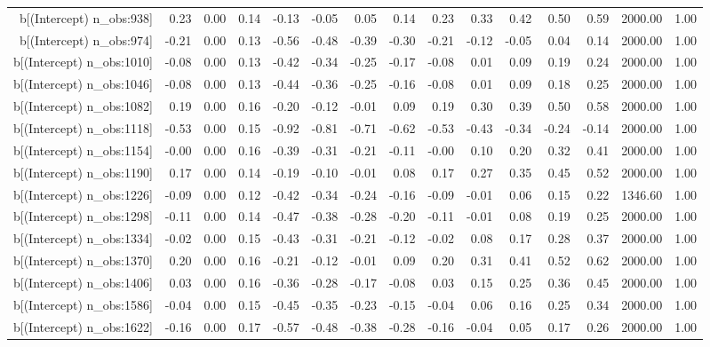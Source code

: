 \begin{table}[ht]
\begin{tabular}{rrrrrrrrrrrrrrr}
  b[(Intercept) n\_obs:938] & 0.23 & 0.00 & 0.14 & -0.13 & -0.05 & 0.05 & 0.14 & 0.23 & 0.33 & 0.42 & 0.50 & 0.59 & 2000.00 & 1.00 \\ 
  b[(Intercept) n\_obs:974] & -0.21 & 0.00 & 0.13 & -0.56 & -0.48 & -0.39 & -0.30 & -0.21 & -0.12 & -0.05 & 0.04 & 0.14 & 2000.00 & 1.00 \\ 
  b[(Intercept) n\_obs:1010] & -0.08 & 0.00 & 0.13 & -0.42 & -0.34 & -0.25 & -0.17 & -0.08 & 0.01 & 0.09 & 0.19 & 0.24 & 2000.00 & 1.00 \\ 
  b[(Intercept) n\_obs:1046] & -0.08 & 0.00 & 0.13 & -0.44 & -0.36 & -0.25 & -0.16 & -0.08 & 0.01 & 0.09 & 0.18 & 0.25 & 2000.00 & 1.00 \\ 
  b[(Intercept) n\_obs:1082] & 0.19 & 0.00 & 0.16 & -0.20 & -0.12 & -0.01 & 0.09 & 0.19 & 0.30 & 0.39 & 0.50 & 0.58 & 2000.00 & 1.00 \\ 
  b[(Intercept) n\_obs:1118] & -0.53 & 0.00 & 0.15 & -0.92 & -0.81 & -0.71 & -0.62 & -0.53 & -0.43 & -0.34 & -0.24 & -0.14 & 2000.00 & 1.00 \\ 
  b[(Intercept) n\_obs:1154] & -0.00 & 0.00 & 0.16 & -0.39 & -0.31 & -0.21 & -0.11 & -0.00 & 0.10 & 0.20 & 0.32 & 0.41 & 2000.00 & 1.00 \\ 
  b[(Intercept) n\_obs:1190] & 0.17 & 0.00 & 0.14 & -0.19 & -0.10 & -0.01 & 0.08 & 0.17 & 0.27 & 0.35 & 0.45 & 0.52 & 2000.00 & 1.00 \\ 
  b[(Intercept) n\_obs:1226] & -0.09 & 0.00 & 0.12 & -0.42 & -0.34 & -0.24 & -0.16 & -0.09 & -0.01 & 0.06 & 0.15 & 0.22 & 1346.60 & 1.00 \\ 
  b[(Intercept) n\_obs:1298] & -0.11 & 0.00 & 0.14 & -0.47 & -0.38 & -0.28 & -0.20 & -0.11 & -0.01 & 0.08 & 0.19 & 0.25 & 2000.00 & 1.00 \\ 
  b[(Intercept) n\_obs:1334] & -0.02 & 0.00 & 0.15 & -0.43 & -0.31 & -0.21 & -0.12 & -0.02 & 0.08 & 0.17 & 0.28 & 0.37 & 2000.00 & 1.00 \\ 
  b[(Intercept) n\_obs:1370] & 0.20 & 0.00 & 0.16 & -0.21 & -0.12 & -0.01 & 0.09 & 0.20 & 0.31 & 0.41 & 0.52 & 0.62 & 2000.00 & 1.00 \\ 
  b[(Intercept) n\_obs:1406] & 0.03 & 0.00 & 0.16 & -0.36 & -0.28 & -0.17 & -0.08 & 0.03 & 0.15 & 0.25 & 0.36 & 0.45 & 2000.00 & 1.00 \\ 
  b[(Intercept) n\_obs:1586] & -0.04 & 0.00 & 0.15 & -0.45 & -0.35 & -0.23 & -0.15 & -0.04 & 0.06 & 0.16 & 0.25 & 0.34 & 2000.00 & 1.00 \\ 
  b[(Intercept) n\_obs:1622] & -0.16 & 0.00 & 0.17 & -0.57 & -0.48 & -0.38 & -0.28 & -0.16 & -0.04 & 0.05 & 0.17 & 0.26 & 2000.00 & 1.00 \\ 

\end{tabular}
\end{table}

